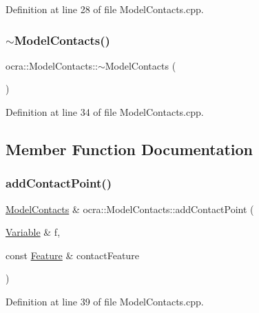 Definition at line 28 of file Model\+Contacts.\+cpp.

\hypertarget{classocra_1_1ModelContacts_ab8ca6e653ccacdff73ae10e7c0750bbf}{}\label{classocra_1_1ModelContacts_ab8ca6e653ccacdff73ae10e7c0750bbf} 
\subsubsection{\texorpdfstring{$\sim$\+Model\+Contacts()}{~ModelContacts()}}
{\footnotesize\ttfamily ocra\+::\+Model\+Contacts\+::$\sim$\+Model\+Contacts (\begin{DoxyParamCaption}{ }\end{DoxyParamCaption})}



Definition at line 34 of file Model\+Contacts.\+cpp.



\subsection{Member Function Documentation}
\hypertarget{classocra_1_1ModelContacts_a209ae06f99698291a84e043fa7b8e32e}{}\label{classocra_1_1ModelContacts_a209ae06f99698291a84e043fa7b8e32e} 
\subsubsection{\texorpdfstring{add\+Contact\+Point()}{addContactPoint()}}
{\footnotesize\ttfamily \hyperlink{classocra_1_1ModelContacts}{Model\+Contacts} \& ocra\+::\+Model\+Contacts\+::add\+Contact\+Point (\begin{DoxyParamCaption}\item[{\hyperlink{classocra_1_1Variable}{Variable} \&}]{f,  }\item[{const \hyperlink{classocra_1_1Feature}{Feature} \&}]{contact\+Feature }\end{DoxyParamCaption})}



Definition at line 39 of file Model\+Contacts.\+cpp.

\hypertarget{classocra_1_1ModelContacts_a40f66a2528a3f7c0538172987de7c919}{}\label{classocra_1_1ModelContacts_a40f66a2528a3f7c0538172987de7c919} 
